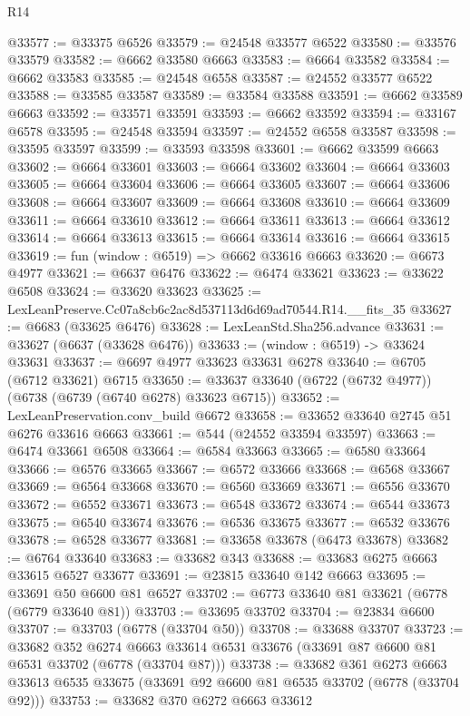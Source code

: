 \begin{lexlean}{R14}
\begin{coremodule}
@33577 := @33375 @6526
@33579 := @24548 @33577 @6522
@33580 := @33576 @33579
@33582 := @6662 @33580 @6663
@33583 := @6664 @33582
@33584 := @6662 @33583
@33585 := @24548 @6558
@33587 := @24552 @33577 @6522
@33588 := @33585 @33587
@33589 := @33584 @33588
@33591 := @6662 @33589 @6663
@33592 := @33571 @33591
@33593 := @6662 @33592
@33594 := @33167 @6578
@33595 := @24548 @33594
@33597 := @24552 @6558 @33587
@33598 := @33595 @33597
@33599 := @33593 @33598
@33601 := @6662 @33599 @6663
@33602 := @6664 @33601
@33603 := @6664 @33602
@33604 := @6664 @33603
@33605 := @6664 @33604
@33606 := @6664 @33605
@33607 := @6664 @33606
@33608 := @6664 @33607
@33609 := @6664 @33608
@33610 := @6664 @33609
@33611 := @6664 @33610
@33612 := @6664 @33611
@33613 := @6664 @33612
@33614 := @6664 @33613
@33615 := @6664 @33614
@33616 := @6664 @33615
@33619 := fun (window : @6519) => @6662 @33616 @6663
@33620 := @6673 @4977
@33621 := @6637 @6476
@33622 := @6474 @33621
@33623 := @33622 @6508
@33624 := @33620 @33623
@33625 := LexLeanPreserve.Cc07a8cb6c2ac8d537113d6d69ad70544.R14.__fits_35
@33627 := @6683 (@33625 @6476)
@33628 := LexLeanStd.Sha256.advance
@33631 := @33627 (@6637 (@33628 @6476))
@33633 := (window : @6519) -> @33624 @33631
@33637 := @6697 @4977 @33623 @33631 @6278
@33640 := @6705 (@6712 @33621) @6715
@33650 := @33637 @33640 (@6722 (@6732 @4977)) (@6738 (@6739 (@6740 @6278) @33623 @6715))
@33652 := LexLeanPreservation.conv_build @6672
@33658 := @33652 @33640 @2745 @51 @6276 @33616 @6663
@33661 := @544 (@24552 @33594 @33597)
@33663 := @6474 @33661 @6508
@33664 := @6584 @33663
@33665 := @6580 @33664
@33666 := @6576 @33665
@33667 := @6572 @33666
@33668 := @6568 @33667
@33669 := @6564 @33668
@33670 := @6560 @33669
@33671 := @6556 @33670
@33672 := @6552 @33671
@33673 := @6548 @33672
@33674 := @6544 @33673
@33675 := @6540 @33674
@33676 := @6536 @33675
@33677 := @6532 @33676
@33678 := @6528 @33677
@33681 := @33658 @33678 (@6473 @33678)
@33682 := @6764 @33640
@33683 := @33682 @343
@33688 := @33683 @6275 @6663 @33615 @6527 @33677
@33691 := @23815 @33640 @142 @6663
@33695 := @33691 @50 @6600 @81 @6527
@33702 := @6773 @33640 @81 @33621 (@6778 (@6779 @33640 @81))
@33703 := @33695 @33702
@33704 := @23834 @6600
@33707 := @33703 (@6778 (@33704 @50))
@33708 := @33688 @33707
@33723 := @33682
    @352
    @6274
    @6663
    @33614
    @6531
    @33676
    (@33691 @87 @6600 @81 @6531 @33702 (@6778 (@33704 @87)))
@33738 := @33682
    @361
    @6273
    @6663
    @33613
    @6535
    @33675
    (@33691 @92 @6600 @81 @6535 @33702 (@6778 (@33704 @92)))
@33753 := @33682
    @370
    @6272
    @6663
    @33612

\end{coremodule}
\end{lexlean}
